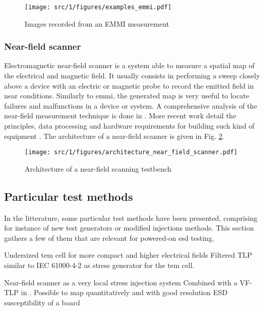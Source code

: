 \begin{figure}[!h]
  \centering
  \texttt{[image: src/1/figures/examples\_emmi.pdf]}
  \caption{Images recorded from an EMMI measurement}
  \label{fig:emmi-examples}
\end{figure}

\subsubsection{Near-field scanner}

Electromagnetic near-field scanner is a system able to measure a spatial map of the electrical and magnetic field.
It usually consists in performing a sweep closely above a device with an electric or magnetic probe to record the emitted field in near conditions.
Similarly to \gls{emmi}, the generated map is very useful to locate failures and malfunctions in a device or system.
A comprehensive analysis of the near-field measurement technique is done in \cite{nfsFirstStudy}.
More recent work detail the principles, data processing and hardware requirements for building such kind of equipment \cite{planarNFSAntenna, NFSMeasurements, NFScanner}.
The architecture of a near-field scanner is given in Fig. \ref{fig:near-field-scanner}.

\begin{figure}[!h]
  \centering
  \texttt{[image: src/1/figures/architecture\_near\_field\_scanner.pdf]}
  \caption{Architecture of a near-field scanning testbench}
  \label{fig:near-field-scanner}
\end{figure}

\subsection{Particular test methods}

In the litterature, some particular test methods have been presented, comprising for instance of new test generators or modified injections methods.
This section gathers a few of them that are relevant for powered-on \gls{esd} testing.

%
Undersized \gls{tem} cell for more compact and higher electrical fields \cite{SDRAMCase}
Filtered TLP similar to IEC 61000-4-2 \cite{iec61000-4-2} as stress generator for the \gls{tem} cell.

%
Near-field scanner as a very local stress injection system
Combined with a VF-TLP in \cite{NearFieldInjectionFabrice}.
Possible to map quantitatively and with good resolution ESD susceptibility of a board

